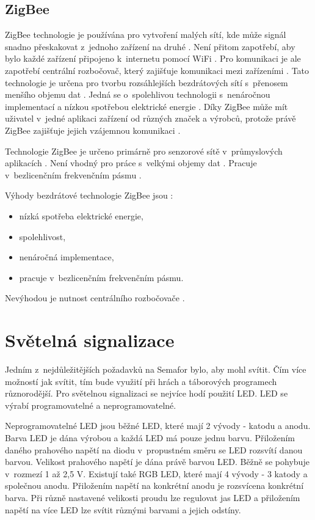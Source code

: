 \subsection{ZigBee}
ZigBee technologie je používána pro vytvoření malých sítí, kde může signál snadno přeskakovat z~jednoho zařízení na druhé \cite{ZigBee_smart}.
Není přitom zapotřebí, aby bylo každé zařízení připojeno k~internetu pomocí WiFi \cite{ZigBee_smart}. Pro komunikaci je ale zapotřebí centrální 
rozbočovač, který zajišťuje komunikaci mezi zařízeními \cite{ZigBee_smart}. Tato technologie je určena pro tvorbu rozsáhlejších bezdrátových sítí
s~přenosem menšího objemu dat \cite{ZigBee_smart}. Jedná se o~spolehlivou technologii s~nenáročnou implementací a nízkou spotřebou elektrické energie 
\cite{ZigBee_smart}. Díky ZigBee může mít uživatel v~jedné aplikaci zařízení 
od různých značek a výrobců, protože právě ZigBee zajišťuje jejich vzájemnou komunikaci \cite{ZigBee_smart}.

Technologie ZigBee je určeno primárně pro senzorové sítě v~průmyslových aplikacích \cite{Bezdrat_muni}. Není vhodný pro práce s~velkými objemy dat \cite{Bezdrat_muni}.
Pracuje v~bezlicenčním frekvenčním pásmu \cite{Bezdrat_muni}.

Výhody bezdrátové technologie ZigBee jsou \cite{ZigBee_smart}:
\begin{itemize}
  \item nízká spotřeba elektrické energie,
  \item spolehlivost, 
  \item nenáročná implementace,
  \item pracuje v~bezlicenčním frekvenčním pásmu. 
\end{itemize}

Nevýhodou je nutnost centrálního rozbočovače \cite{ZigBee_smart}.

\section{Světelná signalizace}
Jedním z~nejdůležitějších požadavků na Semafor bylo, aby mohl svítit. Čím více možností jak svítit, tím bude využití při hrách a táborových 
programech různorodější. Pro světelnou signalizaci se nejvíce hodí použití LED. LED se výrabí programovatelné a neprogramovatelné. 

Neprogramovatelné LED jsou běžné LED, které mají 2 vývody - katodu a anodu. Barva LED je dána výrobou a každá LED má pouze jednu 
barvu. Přiložením daného prahového napětí na diodu v~propustném směru se LED rozsvítí danou barvou. Velikost prahového napětí je dána
právě barvou LED. Běžně se pohybuje v~rozmezí 1 až 2,5 V. Existují také RGB LED, které mají 4 vývody - 3 katody a společnou anodu. 
Přiložením napětí na konkrétní anodu je rozsvícena konkrétní barva. Při různě nastavené velikosti proudu lze regulovat jas LED 
a přiložením napětí na více LED lze svítit různými barvami a jejich odstíny. 

